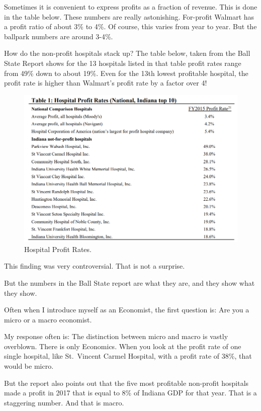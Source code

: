 \documentclass[
]{book}
\begin{document}
Sometimes it is convenient to express profits as a fraction of revenue. This is done in the table below. These numbers are really astonishing. For-profit Walmart has a profit ratio of about 3\% to 4\%. Of course, this varies from year to year. But the ballpark numbers are around 3-4\%.

How do the non-profit hospitals stack up? The table below, taken from the Ball State Report shows for the 13 hospitals listed in that table profit rates range from 49\% down to about 19\%. Even for the 13th lowest profitable hospital, the profit rate is higher than Walmart's profit rate by a factor over 4!

\begin{figure}

{\centering \includegraphics[width=0.75\linewidth]{img/monopoly/fig4} 

}

\caption{Hospital Profit Rates.}\label{fig:monopoly04}
\end{figure}

This finding was very controversial. That is not a surprise.

But the numbers in the Ball State report are what they are, and they show what they show.

Often when I introduce myself as an Economist, the first question is: Are you a micro or a macro economist.

My response often is: The distinction between micro and macro is vastly overblown. There is only Economics.
When you look at the profit rate of one single hospital, like St.~Vincent Carmel Hospital, with a profit rate of 38\%, that would be micro.

But the report also points out that the five most profitable non-profit hospitals made a profit in 2017 that is equal to 8\% of Indiana GDP for that year. That is a staggering number. And that is macro.
\end{document}
